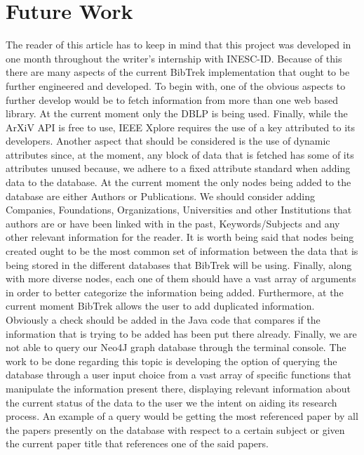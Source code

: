 \documentclass{article}
\begin{document}
\section{Future Work}
The reader of this article has to keep in mind that this project was developed in one month throughout the writer's internship with INESC-ID. Because of this there are many aspects of the current BibTrek implementation that ought to be further engineered and developed. To begin with, one of the obvious aspects to further develop would be to fetch information from more than one web based library. At the current moment only the DBLP is being used. Finally, while the ArXiV API is free to use, IEEE Xplore requires the use of a key attributed to its developers. Another aspect that should be considered is the use of dynamic attributes since, at the moment, any block of data that is fetched has some of its attributes unused because, we adhere to a fixed attribute standard when adding data to the database. At the current moment the only nodes being added to the database are either Authors or Publications. We should consider adding Companies, Foundations, Organizations, Universities and other Institutions that authors are or have been linked with in the past, Keywords/Subjects and any other relevant information for the reader. It is worth being said that nodes being created ought to be the most common set of information between the data that is being stored in the different databases that BibTrek will be using. Finally, along with more diverse nodes, each one of them should have a vast array of arguments in order to better categorize the information being added. Furthermore, at the current moment BibTrek allows the user to add duplicated information. Obviously a check should be added in the Java code that compares if the information that is trying to be added has been put there already. Finally, we are not able to query our Neo4J graph database through the terminal console. The work to be done regarding this topic is developing the option of querying the database through a user input choice from a vast array of specific functions that manipulate the information present there, displaying relevant information about the current status of the data to the user we the intent on aiding its research process. An example of a query would be getting the most referenced paper by all the papers presently on the database with respect to a certain subject or given the current paper title that references one of the said papers.
\end{document}
